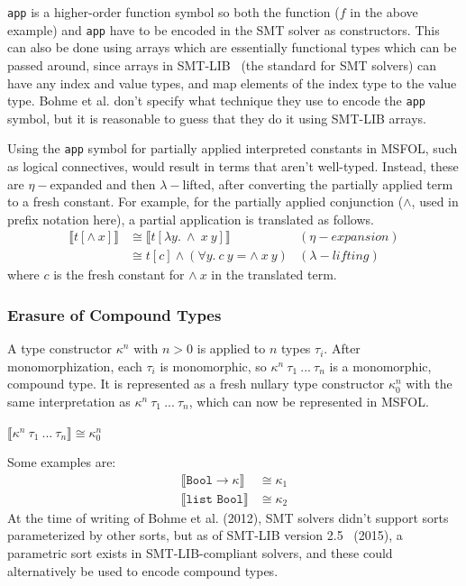 \documentclass[11pt]{article}
\begin{document}
	\texttt{app} is a higher-order 
	function symbol so both the function 
	($f$ in the above example) and 
	\texttt{app} have to be encoded 
	in the SMT solver as constructors.
	This can also be done using arrays 
	which are essentially functional 
	types which can be passed
	around, since arrays in 
	SMT-LIB~\cite{BarFT-SMTLIB} (the 
	standard for SMT solvers)
	can have any index and value types, 
	and map elements of the index type 
	to the value type. Bohme et al. 
	don't specify what technique 
	they use to encode the 
	\texttt{app} symbol, but it is 
	reasonable to guess that they do
	it using SMT-LIB arrays.
	
	Using the \texttt{app} symbol
	for partially applied interpreted 
	constants in MSFOL, such as 
	logical connectives, would result 
	in terms that aren't well-typed.
	Instead, these are $\eta-$expanded 
	and then $\lambda-$lifted, after 
	converting the partially applied 
	term to a fresh constant. For example, 
	for the partially applied 
	conjunction ($\land$, used in prefix 
	notation here), a partial application is 
	translated as follows.
	\begin{align*}
	\llbracket t [\land\ x] 
	\rrbracket &\cong \llbracket 
	t[\lambda y.\ \land\ x\ y]
	\rrbracket&(\eta-expansion)\\
	&\cong t[c]  \land (\forall y.\ 
	c\ y = \land\ x\ y) &(\lambda-lifting)
	\end{align*}
	where $c$ is the fresh constant for 
	$\land\ x$ in the translated term.
	
	\subsubsection{Erasure of Compound Types}
	A type constructor $\kappa^n$ with 
	$n > 0$ is applied to $n$ types 
	$\tau_i$. After monomorphization, 
	each $\tau_i$ is monomorphic, so 
	$\kappa^n\ \tau_1\ ...\ \tau_n$ 
	is a monomorphic, compound type. It
	is represented as a fresh nullary 
	type constructor $\kappa_0^n$ with 
	the same interpretation as 
	$\kappa^n\ \tau_1\ ...\ \tau_n$, 
	which can now be represented in 
	MSFOL.
	\begin{center}
		$\llbracket \kappa^n\ 
		\tau_1\ ...\ \tau_n \rrbracket
		\cong \kappa_0^n$
	\end{center}
	Some examples are:
	\begin{align*}
	\llbracket \texttt{Bool} \to
	\kappa \rrbracket &\cong \kappa_1\\
	\llbracket \texttt{list\ Bool}
	\rrbracket &\cong \kappa_2
	\end{align*}
	At the time of writing of Bohme et al.
	(2012),	SMT solvers didn't support sorts 
	parameterized by other sorts, but as of
	SMT-LIB version 2.5~\cite{BarFT-RR-15}
	(2015), 
	a parametric sort exists in 
	SMT-LIB-compliant solvers, 
	and these could alternatively be 
	used to encode compound types.
	
\end{document}
